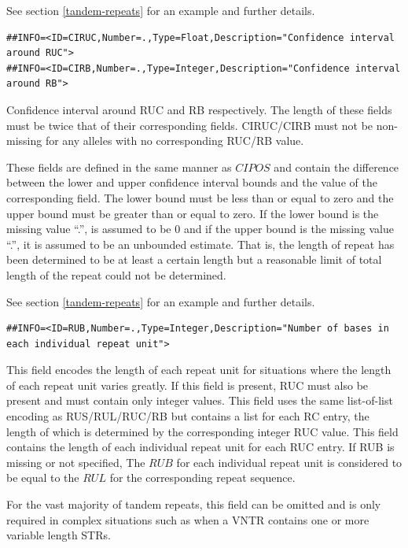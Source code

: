 \documentclass[8pt]{article}
\begin{document}
See section \ref{tandem-repeats} for an example and further details.

\footnotesize
\begin{verbatim}
##INFO=<ID=CIRUC,Number=.,Type=Float,Description="Confidence interval around RUC">
##INFO=<ID=CIRB,Number=.,Type=Integer,Description="Confidence interval around RB">

\end{verbatim}
\normalsize

Confidence interval around RUC and RB respectively.
The length of these fields must be twice that of their corresponding fields.
CIRUC/CIRB must not be non-missing for any alleles with no corresponding RUC/RB value.

These fields are defined in the same manner as $CIPOS$ and contain the difference between the lower and upper confidence interval bounds and the value of the corresponding field.
The lower bound must be less than or equal to zero and the upper bound must be greater than or equal to zero.
If the lower bound is the missing value ``.'', is assumed to be 0 and if the upper bound is the missing value ``.'', it is assumed to be an unbounded estimate.
That is, the length of repeat has been determined to be at least a certain length but a reasonable limit of total length of the repeat could not be determined.

See section \ref{tandem-repeats} for an example and further details.

\footnotesize
\begin{verbatim}
##INFO=<ID=RUB,Number=.,Type=Integer,Description="Number of bases in each individual repeat unit">
\end{verbatim}
\normalsize

This field encodes the length of each repeat unit for situations where the length of each repeat unit varies greatly.
If this field is present, RUC must also be present and must contain only integer values.
This field uses the same list-of-list encoding as RUS/RUL/RUC/RB but contains a list for each RC entry, the length of which is determined by the corresponding integer RUC value.
This field contains the length of each individual repeat unit for each RUC entry.
If RUB is missing or not specified, The $RUB$ for each individual repeat unit is considered to be equal to the $RUL$ for the corresponding repeat sequence.

For the vast majority of tandem repeats, this field can be omitted and is only required in complex situations such as when a VNTR contains one or more variable length STRs.
\end{document}
